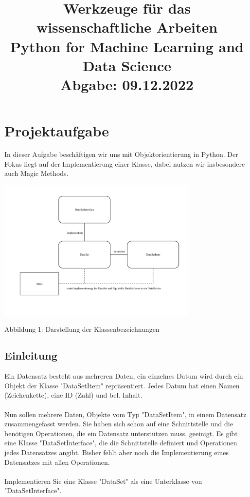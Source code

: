 \documentclass[]{article}
\title{Werkzeuge für das wissenschaftliche Arbeiten\\
Python for Machine Learning and Data Science\\
Abgabe: 09.12.2022}
\date{} %
\begin{document}
\maketitle
\subtitle{}

\tableofcontents
\section{Projektaufgabe}
In dieser Aufgabe beschäftigen wir uns mit Objektorientierung in Python.
Der Fokus liegt auf der Implementierung einer Klasse, dabei nutzen wir insbesondere auch Magic Methods.

\includegraphics[width=10cm]{./../diagram/classes_files.pdf}  
\begin{center}
\caption{Abbildung 1: Darstellung der Klassenbezeichnungen}
\end{center}
\subsection{Einleitung}
Ein Datensatz besteht aus mehreren Daten, ein einzelnes Datum wird durch ein Objekt der Klasse "DataSetItem" repräsentiert.
Jedes Datum hat einen Namen (Zeichenkette), eine ID (Zahl) und bel. Inhalt.\\
\\
Nun sollen mehrere Daten, Objekte vom Typ "DataSetItem", in einem Datensatz zusammengefasst werden.
Sie haben sich schon auf eine Schnittstelle und die benötigen Operationen, die ein Datensatz unterstützen muss, geeinigt.
Es gibt eine Klasse "DataSetInterface", die die Schnittstelle definiert und Operationen jedes Datensatzes angibt.
Bisher fehlt aber noch die Implementierung eines Datensatzes mit allen Operationen.\\
\\
Implementieren Sie eine Klasse "DataSet" als eine Unterklasse von "DataSetInterface".\\
\end{document}
